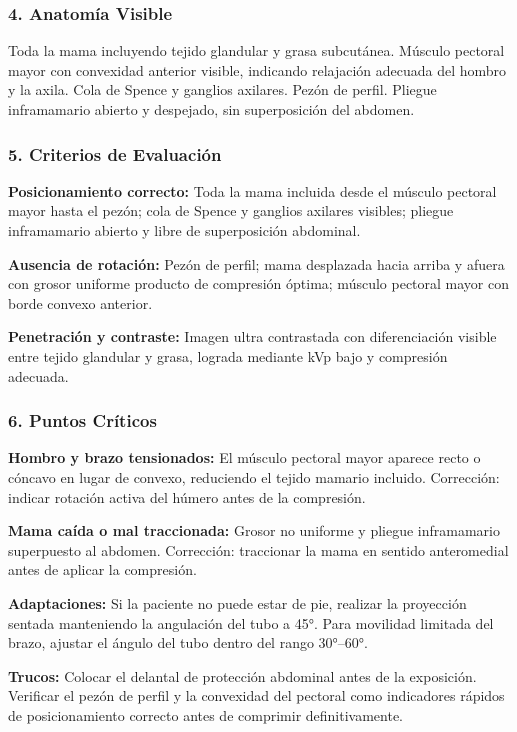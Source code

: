 	\subsubsection*{4. Anatomía Visible}
	
	Toda la mama incluyendo tejido glandular y grasa subcutánea. Músculo pectoral mayor con convexidad anterior visible, indicando relajación adecuada del hombro y la axila. Cola de Spence y ganglios axilares. Pezón de perfil. Pliegue inframamario abierto y despejado, sin superposición del abdomen.
	
	\subsubsection*{5. Criterios de Evaluación}
	
	\textbf{Posicionamiento correcto:} Toda la mama incluida desde el músculo pectoral mayor hasta el pezón; cola de Spence y ganglios axilares visibles; pliegue inframamario abierto y libre de superposición abdominal.
	
	\textbf{Ausencia de rotación:} Pezón de perfil; mama desplazada hacia arriba y afuera con grosor uniforme producto de compresión óptima; músculo pectoral mayor con borde convexo anterior.
	
	\textbf{Penetración y contraste:} Imagen ultra contrastada con diferenciación visible entre tejido glandular y grasa, lograda mediante kVp bajo y compresión adecuada.
	
	\subsubsection*{6. Puntos Críticos}
	
	\textbf{Hombro y brazo tensionados:} El músculo pectoral mayor aparece recto o cóncavo en lugar de convexo, reduciendo el tejido mamario incluido. Corrección: indicar rotación activa del húmero antes de la compresión.
	
	\textbf{Mama caída o mal traccionada:} Grosor no uniforme y pliegue inframamario superpuesto al abdomen. Corrección: traccionar la mama en sentido anteromedial antes de aplicar la compresión.
	
	\textbf{Adaptaciones:} Si la paciente no puede estar de pie, realizar la proyección sentada manteniendo la angulación del tubo a 45°. Para movilidad limitada del brazo, ajustar el ángulo del tubo dentro del rango 30°--60°.
	
	\textbf{Trucos:} Colocar el delantal de protección abdominal antes de la exposición. Verificar el pezón de perfil y la convexidad del pectoral como indicadores rápidos de posicionamiento correcto antes de comprimir definitivamente.
	
